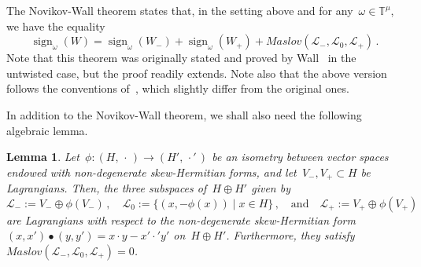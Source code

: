 \documentclass{amsart}
\newcommand{\sign}{\operatorname{sign}}
\newtheorem{lem}[thm]{Lemma}
\theoremstyle{definition}
\theoremstyle{remark}
\begin{document}
	The Novikov-Wall theorem states that, in the setting above and for any~$\omega\in\mathbb{T}^\mu$, we have the equality
	\begin{equation}
		\label{eq:NW}
		\sign_\omega(W)=\sign_\omega(W_-)+\sign_\omega(W_+)+\mathit{Maslov}(\mathcal{L}_-,\mathcal{L}_0,\mathcal{L}_+)\,.
	\end{equation}
	Note that this theorem was originally stated and proved by Wall~\cite{Wal} in the untwisted case, but the proof readily extends. Note also that the above version follows the conventions of~\cite[Chapter~IV.3]{Tur}, which slightly differ from the original ones.
	
	\medskip
	
	In addition to the Novikov-Wall theorem, we shall also need the following algebraic lemma.
	
	\begin{lem}
		\label{lem:alg}
		Let~$\phi\colon(H,\,\cdot\,)\to(H',\,\cdot'\,)$ be an isometry between vector spaces endowed with non-degenerate skew-Hermitian forms,
		and let~$V_-,V_+\subset H$ be Lagrangians. Then, the three subspaces of~$H\oplus H'$ given by
		\[
		\mathcal{L}_-:=V_-\oplus\phi(V_-)\,,\quad \mathcal{L}_0:=\{(x,-\phi(x))\mid x\in H\}\,,\quad\text{and}\quad \mathcal{L}_+:=V_+\oplus\phi(V_+)
		\]
		are Lagrangians with respect to the non-degenerate skew-Hermitian form~$(x,x')\bullet (y,y')=x\cdot y-x'\cdot'y'$ on~$H\oplus H'$.
		Furthermore, they satisfy~$\mathit{Maslov}(\mathcal{L}_-,\mathcal{L}_0,\mathcal{L}_+)=0$.
	\end{lem}
\end{document}
